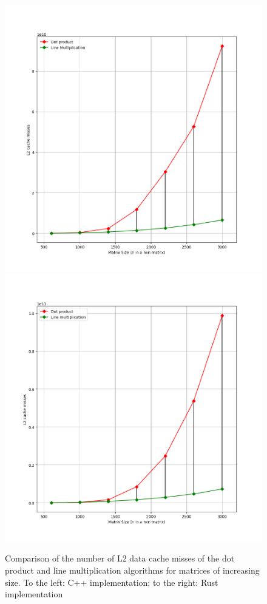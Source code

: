 \documentclass{report}
\begin{document}
				\begin{figure}[H]
					\begin{adjustbox}{center}
						\includegraphics[scale=0.4]{cpp_dot_line_l2.png}
						\includegraphics[scale=0.4]{rs_l2_misses.png}
					\end{adjustbox}
					\caption{Comparison of the number of L2 data cache misses of the dot product and line multiplication algorithms for matrices of increasing size. To the left: C++ implementation; to the right: Rust implementation}
				\end{figure}
			
\end{document}
